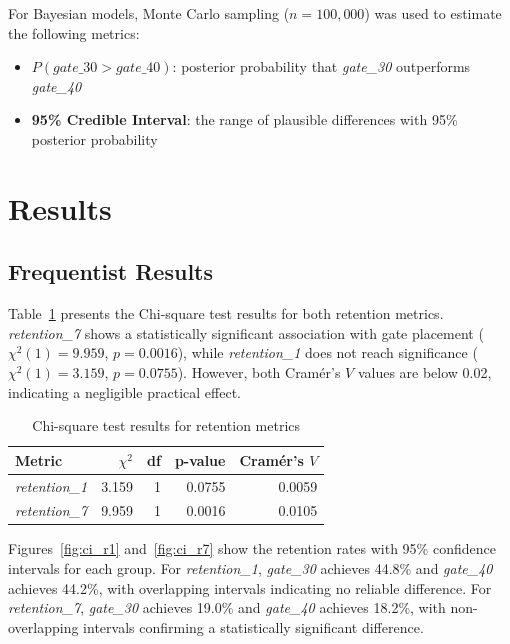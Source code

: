 \documentclass[12pt]{article}
\begin{document}
For Bayesian models, Monte Carlo sampling ($n = 100{,}000$) was used to estimate 
the following metrics:

\begin{itemize}
    \item $P(\textit{gate\_30} > \textit{gate\_40})$: posterior probability that \textit{gate\_30} outperforms \textit{gate\_40}
    \item \textbf{95\% Credible Interval}: the range of plausible differences with 95\% posterior probability
\end{itemize}

\section{Results}

\subsection{Frequentist Results}

Table~\ref{tab:chisq} presents the Chi-square test results for both retention metrics. 
\textit{retention\_7} shows a statistically significant association with gate placement 
($\chi^2(1) = 9.959$, $p = 0.0016$), while \textit{retention\_1} does not reach 
significance ($\chi^2(1) = 3.159$, $p = 0.0755$). However, both Cramér's $V$ values 
are below 0.02, indicating a negligible practical effect.

\begin{table}[H]
\centering
\begin{tabular}{lrrrr}
\toprule
\textbf{Metric} & \textbf{$\chi^2$} & \textbf{df} & \textbf{p-value} & \textbf{Cramér's $V$} \\
\midrule
\textit{retention\_1} & 3.159 & 1 & 0.0755 & 0.0059 \\
\textit{retention\_7} & 9.959 & 1 & 0.0016 & 0.0105 \\
\bottomrule
\end{tabular}
\caption{Chi-square test results for retention metrics}
\label{tab:chisq}
\end{table}

Figures~\ref{fig:ci_r1} and~\ref{fig:ci_r7} show the retention rates with 95\% 
confidence intervals for each group. For \textit{retention\_1}, \textit{gate\_30} 
achieves 44.8\% and \textit{gate\_40} achieves 44.2\%, with overlapping intervals 
indicating no reliable difference. For \textit{retention\_7}, \textit{gate\_30} 
achieves 19.0\% and \textit{gate\_40} achieves 18.2\%, with non-overlapping intervals 
confirming a statistically significant difference.
\end{document}
